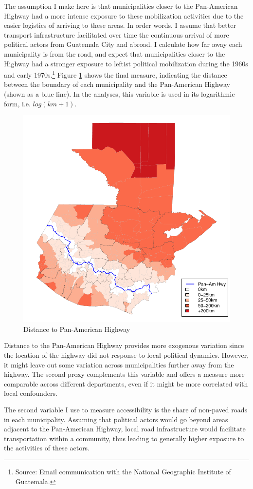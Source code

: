 \documentclass[12pt, notitlepage]{article}
\begin{document}
The assumption I make here is that municipalities closer to the Pan-American Highway had a more intense exposure to these mobilization activities due to the easier logistics of arriving to these areas.
In order words, I assume that better transport infrastructure facilitated over time the continuous arrival of more political actors from Guatemala City and abroad.
I calculate how far away each municipality is from the road, and expect that municipalities closer to the Highway had a stronger exposure to leftist political mobilization during the 1960s and early 1970s.\footnote{Source: Email communication with the National Geographic Institute of Guatemala.}
Figure \ref{fig:map_panam} shows the final measure, indicating the distance between the boundary of each municipality and the Pan-American Highway (shown as a blue line). In the analyses, this variable is used in its logarithmic form, i.e. $log(km + 1)$.

\begin{figure}[htb!]
  \centering
    \includegraphics[width = .4\textwidth]{img/map_panam}

  \caption{Distance to Pan-American Highway} \label{fig:map_panam}

\end{figure}

Distance to the Pan-American Highway provides more exogenous variation since the location of the highway did not response to local political dynamics.
However, it might leave out some variation across municipalities further away from the highway.
The second proxy complements this variable and offers a measure more comparable across different departments, even if it might be more correlated with local confounders.

The second variable I use to measure accessibility is the share of non-paved roads in each municipality.
Assuming that political actors would go beyond areas adjacent to the Pan-American Highway, local road infrastructure would facilitate transportation within a community, thus leading to generally higher exposure to the activities of these actors.
\end{document}

